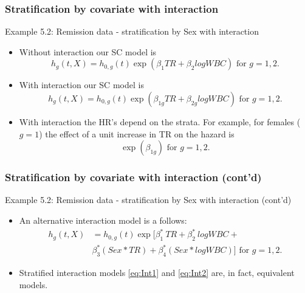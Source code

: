 \documentclass{beamer}
\theoremstyle{definition}
\begin{document}
\begin{frame}
\frametitle{Stratification by covariate with interaction}
\begin{block}{Example 5.2: Remission data - stratification by Sex with interaction}
\begin{itemize}
\item Without interaction our SC model is
\[
h_g(t,X) = h_{0,g}(t)\exp(\beta_1 TR + \beta_2 logWBC) \text{ for } g=1,2.
\]
\item With interaction our SC model is
\begin{equation} \label{eq:Int1}
h_g(t,X) = h_{0,g}(t)\exp(\beta_{1g} TR + \beta_{2g} logWBC) \text{ for } g=1,2.
\end{equation}
\item With interaction the HR's depend on the strata. For example, for females ($g=1$) the effect of a unit increase in TR on the hazard is
\[
\exp(\beta_{1g}) \text{ for } g=1,2.
\]
\end{itemize}
\end{block}
\end{frame}

\begin{frame}
\frametitle{Stratification by covariate with interaction (cont'd)}
\begin{block}{Example 5.2: Remission data - stratification by Sex with interaction (cont'd)}
\begin{itemize}
\item An alternative interaction model is a follows:
\begin{equation}\label{eq:Int2}
\begin{aligned}
h_g(t,X) & = h_{0,g}(t)\exp[\beta_1^*\ TR + \beta_2^*\ logWBC +  \\
& \beta_3^*(Sex*TR) + \beta_4^*(Sex*logWBC) ] \text{ for } g=1,2.
\end{aligned}
\end{equation}
\item Stratified interaction models \eqref{eq:Int1} and \eqref{eq:Int2} are, in fact, equivalent models.
\end{itemize}
\end{block}
\end{frame}
\end{document}
